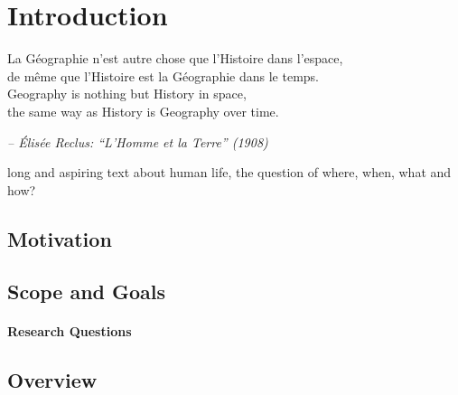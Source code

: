 
\section{Introduction} %
\label{sec:introduction}

\begin{quoteit}
\large
La Géographie n’est autre chose que l’Histoire dans l’espace, \\
de même que l’Histoire est la Géographie dans le temps. \\

Geography is nothing but History in space, \\
the same way as History is Geography over time.
\end{quoteit}
\hfill \textit{-- Élisée Reclus: ``L'Homme et la Terre'' (1908)}

long and aspiring text about human life, the question of where, when, what and how?



\subsection{Motivation} %
\label{sub:motivation}




\subsection{Scope and Goals} %
\label{sub:goals}





\paragraph{Research Questions} %
\label{par:research_questions}






\subsection{Overview} %
\label{sub:overview}




